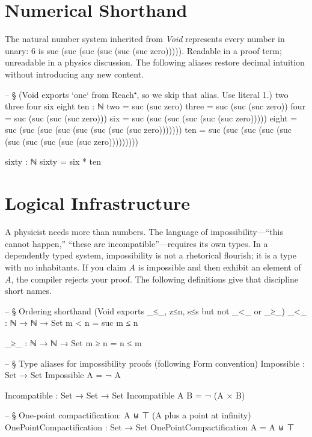\documentclass[11pt,a4paper]{book}
\def\texttt#1{#1}%
\begin{document}
\section{Numerical Shorthand}

The natural number system inherited from \textit{Void} represents every number in unary: $6$ is \texttt{suc (suc (suc (suc (suc (suc zero)))))}. Readable in a proof term; unreadable in a physics discussion. The following aliases restore decimal intuition without introducing any new content.

\begin{code}
-- § (Void exports `one` from Reach⁺, so we skip that alias. Use literal 1.)
two three four six eight ten : ℕ
two   = suc (suc zero)
three = suc (suc (suc zero))
four  = suc (suc (suc (suc zero)))
six   = suc (suc (suc (suc (suc (suc zero)))))
eight = suc (suc (suc (suc (suc (suc (suc (suc zero)))))))
ten   = suc (suc (suc (suc (suc (suc (suc (suc (suc (suc zero)))))))))

sixty : ℕ
sixty = six * ten
\end{code}

\section{Logical Infrastructure}

A physicist needs more than numbers. The language of impossibility---``this cannot happen,'' ``these are incompatible''---requires its own types. In a dependently typed system, impossibility is not a rhetorical flourish; it is a type with no inhabitants. If you claim $A$ is impossible and then exhibit an element of $A$, the compiler rejects your proof. The following definitions give that discipline short names.

\begin{code}
-- § Ordering shorthand (Void exports _≤_, z≤n, s≤s but not _<_ or _≥_)
_<_ : ℕ → ℕ → Set
m < n = suc m ≤ n

_≥_ : ℕ → ℕ → Set
m ≥ n = n ≤ m

-- § Type aliases for impossibility proofs (following Form convention)
Impossible : Set → Set
Impossible A = ¬ A

Incompatible : Set → Set → Set
Incompatible A B = ¬ (A × B)

-- § One-point compactification: A ⊎ ⊤ (A plus a point at infinity)
OnePointCompactification : Set → Set
OnePointCompactification A = A ⊎ ⊤
\end{code}
\end{document}
